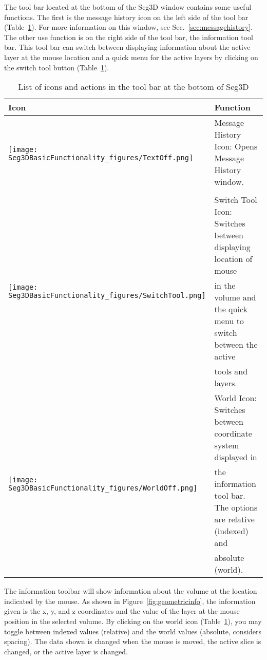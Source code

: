 \documentclass[fleqn,11pt,openany]{book}
\begin{document}
The tool bar located at the bottom of the Seg3D window contains some useful functions.
The first is the message history icon on the left side of the tool bar (Table~\ref{tab:toolbaricons}).
For more information on this window, see Sec.~\ref{sec:messagehistory}.
The other use function is on the right side of the tool bar, the information tool bar.
This tool bar can switch between displaying information about the active layer at the mouse location and a quick menu for the active layers by clicking on the switch tool button (Table~\ref{tab:toolbaricons}).  


\begin{table}[h!]
\label{tab:toolbaricons}
\caption{List of icons and actions in the tool bar at the bottom of Seg3D}
\begin{tabular}{|l|l|}
\hline
{\bf Icon} & {\bf Function}\\
\hline
\multirow{2}{*}{ \texttt{[image: Seg3DBasicFunctionality\_figures/TextOff.png]} }
& Message History Icon: Opens Message History window.\\
& \\
\hline
\multirow{3}{*}{ \texttt{[image: Seg3DBasicFunctionality\_figures/SwitchTool.png]} }
& Switch Tool Icon:  Switches between displaying location of mouse\\
& in the volume and the quick menu to switch between the active \\
& tools and layers.\\
\hline
\multirow{3}{*}{ \texttt{[image: Seg3DBasicFunctionality\_figures/WorldOff.png]} }
& World Icon:  Switches between coordinate system displayed in \\
& the information tool bar.  The options are relative (indexed) and \\
& absolute (world).\\
\hline
\end{tabular}
\end{table}

The information toolbar will show information about the volume at the location indicated by the mouse.
As shown in Figure~\ref{fig:geometricinfo}, the information given is the x, y, and z coordinates and the value of the layer at the mouse position in the selected volume.
By clicking on the world icon (Table~\ref{tab:toolbaricons}), you may toggle between indexed values (relative) and the world values (absolute, considers spacing).
The data shown is changed when the mouse is moved, the active slice is changed, or the active layer is changed.
\end{document}
